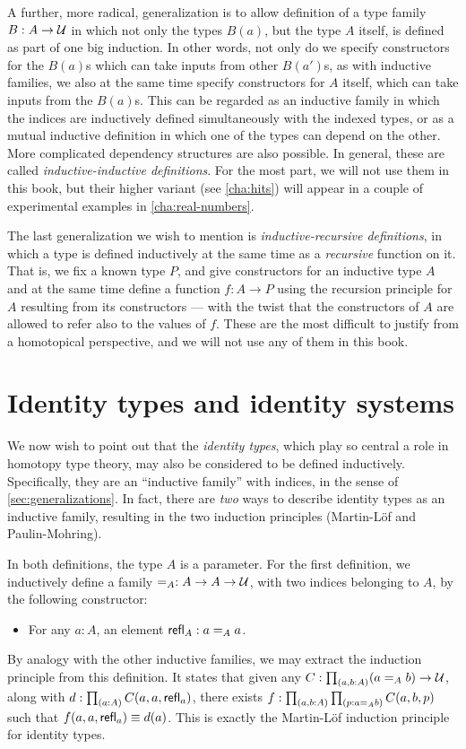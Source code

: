 A further, more radical, generalization is to allow definition of a type family $B:A\to \mathcal{U}$ in which not only the types $B(a)$, but the type $A$ itself, is defined as part of one big induction.
In other words, not only do we specify constructors for the $B(a)$s which can take inputs from other $B(a')$s, as with inductive families, we also at the same time specify constructors for $A$ itself, which can take inputs from the $B(a)$s.
This can be regarded as an inductive family in which the indices are inductively defined simultaneously with the indexed types, or as a mutual inductive definition in which one of the types can depend on the other.
More complicated dependency structures are also possible.
In general, these are called \emph{inductive-inductive definitions}.
For the most part, we will not use them in this book, but their higher variant (see \autoref{cha:hits}) will appear in a couple of experimental examples in \autoref{cha:real-numbers}.

The last generalization we wish to mention is \emph{inductive-recursive definitions}, in which a type is defined inductively at the same time as a \emph{recursive} function on it.
That is, we fix a known type $P$, and give constructors for an inductive type $A$ and at the same time define a function $f:A\to P$ using the recursion principle for $A$ resulting from its constructors --- with the twist that the constructors of $A$ are allowed to refer also to the values of $f$.
These are the most difficult to justify from a homotopical perspective, and we will not use any of them in this book.


\section{Identity types and identity systems}
\label{sec:identity-systems}

We now wish to point out that the \emph{identity types}, which play so central a role in homotopy type theory, may also be considered to be defined inductively.
Specifically, they are an ``inductive family'' with indices, in the sense of \autoref{sec:generalizations}.
In fact, there are \emph{two} ways to describe identity types as an inductive family, resulting in the two induction principles (Martin-L\"of and Paulin-Mohring).

In both definitions, the type $A$ is a parameter.
For the first definition, we inductively define a family $=_A : A\to A\to \mathcal{U}$, with two indices belonging to $A$, by the following constructor:
\begin{itemize}
\item For any $a:A$, an element $\mathsf{refl}_{A} : a=_A a$.
\end{itemize}
By analogy with the other inductive families, we may extract the induction principle from this definition.
It states that given any $C:\prd{a,b:A} (a=_A b) \to \type$, along with $d:\prd{a:A} C(a,a,\refl{a})$, there exists $f:\prd{a,b:A}{p:a=_A b} C(a,b,p)$ such that $f(a,a,\mathsf{refl}_{a})\equiv d(a)$.
This is exactly the Martin-L\"of induction principle for identity types.

